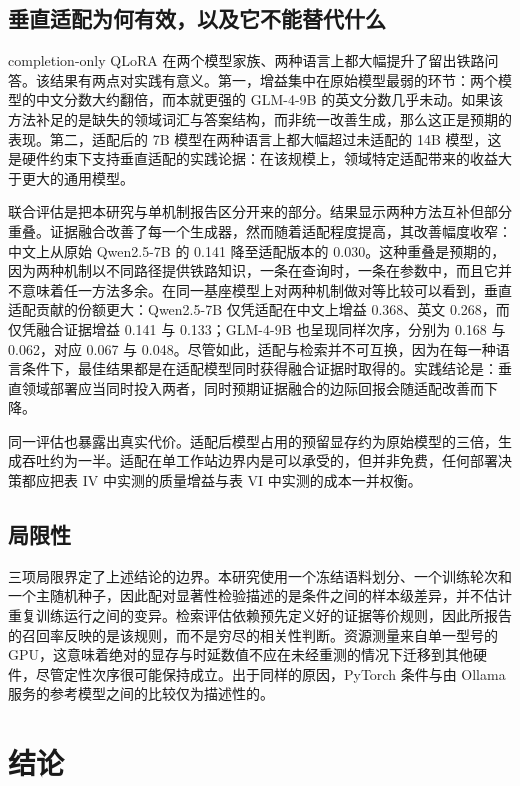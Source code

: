 \documentclass{article}
\begin{document}
\subsection{垂直适配为何有效，以及它不能替代什么}

completion-only QLoRA 在两个模型家族、两种语言上都大幅提升了留出铁路问答。该结果有两点对实践有意义。第一，增益集中在原始模型最弱的环节：两个模型的中文分数大约翻倍，而本就更强的 GLM-4-9B 的英文分数几乎未动。如果该方法补足的是缺失的领域词汇与答案结构，而非统一改善生成，那么这正是预期的表现。第二，适配后的 7B 模型在两种语言上都大幅超过未适配的 14B 模型，这是硬件约束下支持垂直适配的实践论据：在该规模上，领域特定适配带来的收益大于更大的通用模型。

联合评估是把本研究与单机制报告区分开来的部分。结果显示两种方法互补但部分重叠。证据融合改善了每一个生成器，然而随着适配程度提高，其改善幅度收窄：中文上从原始 Qwen2.5-7B 的 0.141 降至适配版本的 0.030。这种重叠是预期的，因为两种机制以不同路径提供铁路知识，一条在查询时，一条在参数中，而且它并不意味着任一方法多余。在同一基座模型上对两种机制做对等比较可以看到，垂直适配贡献的份额更大：Qwen2.5-7B 仅凭适配在中文上增益 0.368、英文 0.268，而仅凭融合证据增益 0.141 与 0.133；GLM-4-9B 也呈现同样次序，分别为 0.168 与 0.062，对应 0.067 与 0.048。尽管如此，适配与检索并不可互换，因为在每一种语言条件下，最佳结果都是在适配模型同时获得融合证据时取得的。实践结论是：垂直领域部署应当同时投入两者，同时预期证据融合的边际回报会随适配改善而下降。

同一评估也暴露出真实代价。适配后模型占用的预留显存约为原始模型的三倍，生成吞吐约为一半。适配在单工作站边界内是可以承受的，但并非免费，任何部署决策都应把表 IV 中实测的质量增益与表 VI 中实测的成本一并权衡。

\subsection{局限性}

三项局限界定了上述结论的边界。本研究使用一个冻结语料划分、一个训练轮次和一个主随机种子，因此配对显著性检验描述的是条件之间的样本级差异，并不估计重复训练运行之间的变异。检索评估依赖预先定义好的证据等价规则，因此所报告的召回率反映的是该规则，而不是穷尽的相关性判断。资源测量来自单一型号的 GPU，这意味着绝对的显存与时延数值不应在未经重测的情况下迁移到其他硬件，尽管定性次序很可能保持成立。出于同样的原因，PyTorch 条件与由 Ollama 服务的参考模型之间的比较仅为描述性的。

\section{结论}
\end{document}
